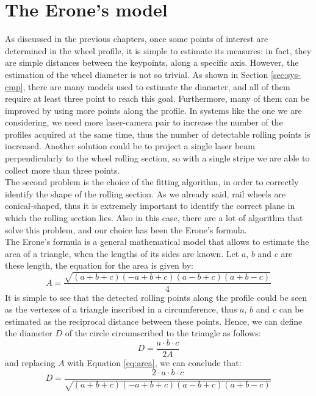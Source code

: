 \section{The Erone's model}
As discussed in the previous chapters, once some points of interest are determined in the wheel profile, it is simple to estimate its measures: in fact, they are simple distances between the keypoints, along a specific axis. However, the estimation of the wheel diameter is not so trivial. As shown in Section \ref{sec:sys-cmp}, there are many models used to estimate the diameter, and all of them require at least three point to reach this goal. Furthermore, many of them can be improved by using more points along the profile. In systems like the one we are considering, we need more laser-camera pair to increase the number of the profiles acquired at the same time, thus the number of detectable rolling points is increased. Another solution could be to project a single laser beam perpendicularly to the wheel rolling section, so with a single stripe we are able to collect more than three points. \\
The second problem is the choice of the fitting algorithm, in order to correctly identify the shape of the rolling section. As we already said, rail wheels are conical-shaped, thus it is extremely important to identify the correct plane in which the rolling section lies. Also in this case, there are a lot of algorithm that solve this problem, and our choice has been the Erone's formula. \\

The Erone's formula is a general mathematical model that allows to estimate the area of a triangle, when the lengths of its sides are known. Let $a$, $b$ and $c$ are these length, the equation for the area is given by:
  \begin{equation}
    A = \frac{\sqrt{( a + b + c )( - a + b + c )( a - b + c )( a + b - c )}}{4}
    \label{eq:area}
  \end{equation}
It is simple to see that the detected rolling points along the profile could be seen as the vertexes of a triangle inscribed in a circumference, thus $a$, $b$ and $c$ can be estimated as the reciprocal distance between these points. %
Hence, we can define the diameter $D$ of the circle circumscribed to the triangle as follows:
  \begin{equation*}
    D = \frac{a\cdot b\cdot c}{2A}
  \end{equation*}
and replacing $A$ with Equation \ref{eq:area}, we can conclude that:
  \begin{equation}
    D = \frac{2\cdot a\cdot b\cdot c}{\sqrt{( a + b + c )( - a + b + c )( a - b + c )( a + b - c )}}
    \label{eq:diam:erone}
  \end{equation}
~\\


